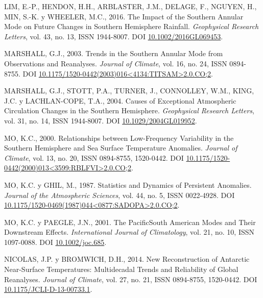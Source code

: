 \documentclass[12pt,oneside,a4paper]{reedthesis}
\newlength{\cslhangindent}
\newenvironment{CSLReferences}[2] %
 {%
  \setlength{\parindent}{0pt}
  \ifodd #1 \everypar{\setlength{\hangindent}{\cslhangindent}}\ignorespaces\fi
  \ifnum #2 > 0
  \setlength{\parskip}{#2\baselineskip}
  \fi
 }%
 {}
\begin{document}
\begin{CSLReferences}{1}{0}
\leavevmode{}%
LIM, E.-P., HENDON, H.H., ARBLASTER, J.M., DELAGE, F., NGUYEN, H., MIN, S.-K. y WHEELER, M.C., 2016. The Impact of the {Southern Annular Mode} on Future Changes in {Southern Hemisphere} Rainfall. \emph{Geophysical Research Letters}, vol. 43, no. 13, ISSN 1944-8007. DOI \href{https://doi.org/10.1002/2016GL069453}{10.1002/2016GL069453}.

\leavevmode{}%
MARSHALL, G.J., 2003. Trends in the {Southern Annular Mode} from {Observations} and {Reanalyses}. \emph{Journal of Climate}, vol. 16, no. 24, ISSN 0894-8755. DOI \href{https://doi.org/10.1175/1520-0442(2003)016\%3C4134:TITSAM\%3E2.0.CO;2}{10.1175/1520-0442(2003)016\textless4134:TITSAM\textgreater2.0.CO;2}.

\leavevmode{}%
MARSHALL, G.J., STOTT, P.A., TURNER, J., CONNOLLEY, W.M., KING, J.C. y LACHLAN-COPE, T.A., 2004. Causes of Exceptional Atmospheric Circulation Changes in the {Southern Hemisphere}. \emph{Geophysical Research Letters}, vol. 31, no. 14, ISSN 1944-8007. DOI \href{https://doi.org/10.1029/2004GL019952}{10.1029/2004GL019952}.

\leavevmode{}%
MO, K.C., 2000. Relationships between {Low-Frequency Variability} in the {Southern Hemisphere} and {Sea Surface Temperature Anomalies}. \emph{Journal of Climate}, vol. 13, no. 20, ISSN 0894-8755, 1520-0442. DOI \href{https://doi.org/10.1175/1520-0442(2000)013\%3C3599:RBLFVI\%3E2.0.CO;2}{10.1175/1520-0442(2000)013\textless3599:RBLFVI\textgreater2.0.CO;2}.

\leavevmode{}%
MO, K.C. y GHIL, M., 1987. Statistics and {Dynamics} of {Persistent Anomalies}. \emph{Journal of the Atmospheric Sciences}, vol. 44, no. 5, ISSN 0022-4928. DOI \href{https://doi.org/10.1175/1520-0469(1987)044\%3C0877:SADOPA\%3E2.0.CO;2}{10.1175/1520-0469(1987)044\textless0877:SADOPA\textgreater2.0.CO;2}.

\leavevmode{}%
MO, K.C. y PAEGLE, J.N., 2001. The {Pacific}{\textendash}{South American} Modes and Their Downstream Effects. \emph{International Journal of Climatology}, vol. 21, no. 10, ISSN 1097-0088. DOI \href{https://doi.org/10.1002/joc.685}{10.1002/joc.685}.

\leavevmode{}%
NICOLAS, J.P. y BROMWICH, D.H., 2014. New {Reconstruction} of {Antarctic Near-Surface Temperatures}: {Multidecadal Trends} and {Reliability} of {Global Reanalyses}. \emph{Journal of Climate}, vol. 27, no. 21, ISSN 0894-8755, 1520-0442. DOI \href{https://doi.org/10.1175/JCLI-D-13-00733.1}{10.1175/JCLI-D-13-00733.1}.


\end{CSLReferences}
\end{document}
